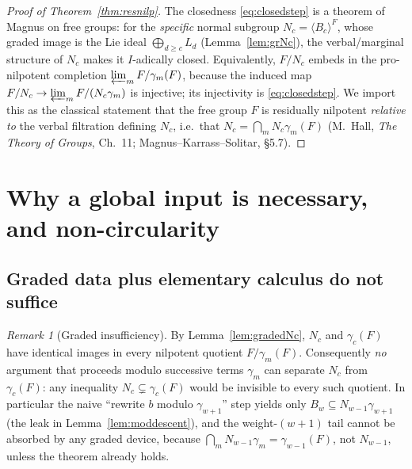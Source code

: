 \documentclass{amsart}
\theoremstyle{definition}
\theoremstyle{remark}
\newtheorem{remark}{Remark}
\begin{document}
\begin{proof}[Proof of Theorem~\ref{thm:resnilp}]
The closedness \eqref{eq:closedstep} is a theorem of Magnus on free groups: for the
\emph{specific} normal subgroup $N_c=\langle B_c\rangle^{F}$, whose graded image is
the Lie ideal $\bigoplus_{d\ge c}L_d$ (Lemma~\ref{lem:grNc}), the verbal/marginal
structure of $N_c$ makes it $I$-adically closed. Equivalently, $F/N_c$ embeds in the
pro-nilpotent completion $\varprojlim_m F/\gamma_m(F)$, because the induced map
$F/N_c\to\varprojlim_m F/(N_c\gamma_m)$ is injective; its injectivity is
\eqref{eq:closedstep}. We import this as the classical statement that the free group
$F$ is residually nilpotent \emph{relative to} the verbal filtration defining $N_c$,
i.e.\ that $N_c=\bigcap_m N_c\gamma_m(F)$ (M.~Hall, \emph{The Theory of Groups},
Ch.~11; Magnus--Karrass--Solitar, \S5.7).
\end{proof}

\section{Why a global input is necessary, and non-circularity}\label{sec:why}

\subsection*{Graded data plus elementary calculus do not suffice}

\begin{remark}[Graded insufficiency]\label{rem:graded-insufficient}
By Lemma~\ref{lem:gradedNc}, $N_c$ and $\gamma_c(F)$ have identical images in every
nilpotent quotient $F/\gamma_m(F)$. Consequently \emph{no} argument that proceeds
modulo successive terms $\gamma_m$ can separate $N_c$ from $\gamma_c(F)$: any
inequality $N_c\subsetneq\gamma_c(F)$ would be invisible to every such quotient. In
particular the naive ``rewrite $b$ modulo $\gamma_{w+1}$'' step yields only
$B_w\subseteq N_{w-1}\gamma_{w+1}$ (the leak in Lemma~\ref{lem:moddescent}), and the
weight-$(w+1)$ tail cannot be absorbed by any graded device, because
$\bigcap_m N_{w-1}\gamma_m=\gamma_{w-1}(F)$, not $N_{w-1}$, unless the theorem
already holds.
\end{remark}
\end{document}
